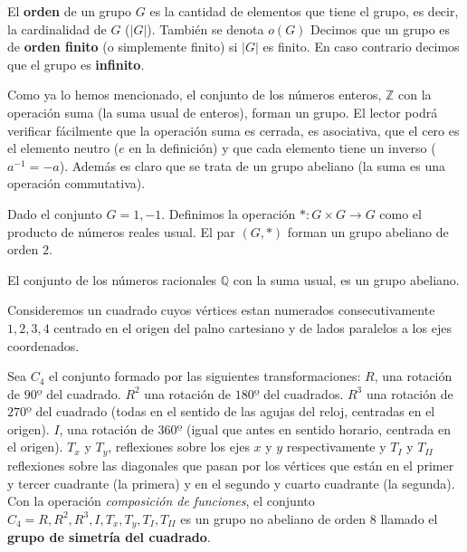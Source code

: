 \documentclass[12pt,]{krantz}
\theoremstyle{definition}
\theoremstyle{definition}
\theoremstyle{definition}
\theoremstyle{remark}
\let\BeginKnitrBlock\begin \let\EndKnitrBlock\end
\begin{document}
El \textbf{orden} de un grupo \(G\) es la cantidad de elementos que
tiene el grupo, es decir, la cardinalidad de \(G\) (\(|G|\)). También se
denota \(o(G)\) Decimos que un grupo es de \textbf{orden finito} (o
simplemente finito) si \(|G|\) es finito. En caso contrario decimos que
el grupo es \textbf{infinito}.

\BeginKnitrBlock{example}
\protect\hypertarget{exm:unnamed-chunk-53}{}{\label{exm:unnamed-chunk-53}
}Como ya lo hemos mencionado, el conjunto de los números enteros,
\(\mathbb{Z}\) con la operación suma (la suma usual de enteros), forman
un grupo. El lector podrá verificar fácilmente que la operación suma es
cerrada, es asociativa, que el cero es el elemento neutro (\(e\) en la
definición) y que cada elemento tiene un inverso (\(a^{-1}=-a\)). Además
es claro que se trata de un grupo abeliano (la suma es una operación
commutativa).
\EndKnitrBlock{example}

\BeginKnitrBlock{example}
\protect\hypertarget{exm:unnamed-chunk-54}{}{\label{exm:unnamed-chunk-54}
}Dado el conjunto \(G={1,-1}\). Definimos la operación
\(\ast:G\times G \longrightarrow G\) como el producto de números reales
usual. El par \((G,\ast)\) forman un grupo abeliano de orden \(2\).
\EndKnitrBlock{example}

\BeginKnitrBlock{example}
\protect\hypertarget{exm:unnamed-chunk-55}{}{\label{exm:unnamed-chunk-55}
}El conjunto de los números racionales \(\mathbb{Q}\) con la suma usual,
es un grupo abeliano.
\EndKnitrBlock{example}

\BeginKnitrBlock{example}
\protect\hypertarget{exm:unnamed-chunk-56}{}{\label{exm:unnamed-chunk-56}
}Consideremos un cuadrado cuyos vértices estan numerados
consecutivamente \(1,2,3,4\) centrado en el origen del palno cartesiano
y de lados paralelos a los ejes coordenados.

Sea \(C_{4}\) el conjunto formado por las siguientes transformaciones:
\(R\), una rotación de \(90º\) del cuadrado. \(R^{2}\) una rotación de
\(180º\) del cuadrados. \(R^{3}\) una rotación de \(270º\) del cuadrado
(todas en el sentido de las agujas del reloj, centradas en el origen).
\(I\), una rotación de \(360º\) (igual que antes en sentido horario,
centrada en el origen). \(T_{x}\) y \(T_{y}\), reflexiones sobre los
ejes \(x\) y \(y\) respectivamente y \(T_{I}\) y \(T_{II}\) reflexiones
sobre las diagonales que pasan por los vértices que están en el primer y
tercer cuadrante (la primera) y en el segundo y cuarto cuadrante (la
segunda). Con la operación \emph{composición de funciones}, el conjunto
\(C_{4} = {R, R^{2}, R^{3}, I, T_{x}, T_{y}, T_{I}, T_{II}}\) es un
grupo no abeliano de orden \(8\) llamado el \textbf{grupo de simetría
del cuadrado}.
\EndKnitrBlock{example}
\end{document}
